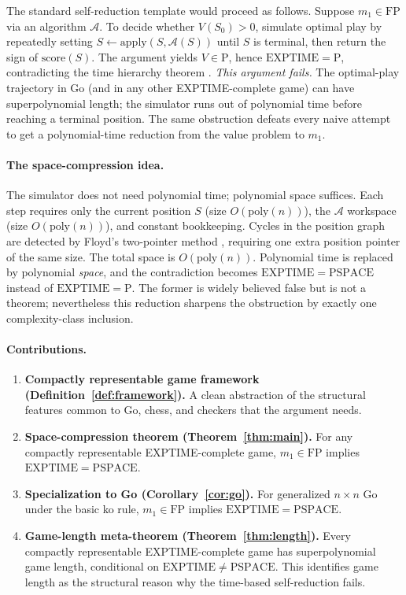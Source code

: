 \documentclass[11pt,a4paper]{amsart}
\theoremstyle{plain}
\theoremstyle{definition}
\theoremstyle{remark}
\newcommand{\FP}{\mathrm{FP}}
\newcommand{\PTIME}{\mathrm{P}}
\newcommand{\EXPTIME}{\mathrm{EXPTIME}}
\newcommand{\PSPACE}{\mathrm{PSPACE}}
\newcommand{\Apply}{\mathrm{apply}}
\newcommand{\score}{\mathrm{score}}
\newcommand{\poly}{\mathrm{poly}}
\begin{document}
The standard self-reduction template would proceed as follows. Suppose
$m_1 \in \FP$ via an algorithm $\mathcal{A}$. To decide whether
$V(S_0) > 0$, simulate optimal play by repeatedly setting
$S \leftarrow \Apply(S, \mathcal{A}(S))$ until $S$ is terminal, then
return the sign of $\score(S)$. The argument yields $V \in \PTIME$,
hence $\EXPTIME = \PTIME$, contradicting the time hierarchy theorem
\cite{HS65}. \emph{This argument fails.} The optimal-play trajectory
in Go (and in any other EXPTIME-complete game) can have
superpolynomial length; the simulator runs out of polynomial time
before reaching a terminal position. The same obstruction defeats every
naive attempt to get a polynomial-time reduction from the value problem
to $m_1$.

\paragraph{The space-compression idea.}
The simulator does not need polynomial time; polynomial space suffices.
Each step requires only the current position $S$ (size
$O(\poly(n))$), the $\mathcal{A}$ workspace (size $O(\poly(n))$), and
constant bookkeeping. Cycles in the position graph are detected by
Floyd's two-pointer method \cite{Flo67}, requiring one extra position
pointer of the same size. The total space is $O(\poly(n))$. Polynomial
time is replaced by polynomial \emph{space}, and the contradiction
becomes $\EXPTIME = \PSPACE$ instead of $\EXPTIME = \PTIME$. The
former is widely believed false but is not a theorem; nevertheless
this reduction sharpens the obstruction by exactly one complexity-class
inclusion.

\paragraph{Contributions.}
\begin{enumerate}[label=(C\arabic*),leftmargin=2.5em]
  \item \textbf{Compactly representable game framework
    (Definition~\ref{def:framework}).}
    A clean abstraction of the structural features common to Go,
    chess, and checkers that the argument needs.
  \item \textbf{Space-compression theorem (Theorem~\ref{thm:main}).}
    For any compactly representable EXPTIME-complete game,
    $m_1 \in \FP$ implies $\EXPTIME = \PSPACE$.
  \item \textbf{Specialization to Go (Corollary~\ref{cor:go}).}
    For generalized $n \times n$ Go under the basic ko rule,
    $m_1 \in \FP$ implies $\EXPTIME = \PSPACE$.
  \item \textbf{Game-length meta-theorem (Theorem~\ref{thm:length}).}
    Every compactly representable EXPTIME-complete game has
    superpolynomial game length, conditional on
    $\EXPTIME \neq \PSPACE$. This identifies game length as the
    structural reason why the time-based self-reduction fails.
\end{enumerate}
\end{document}
